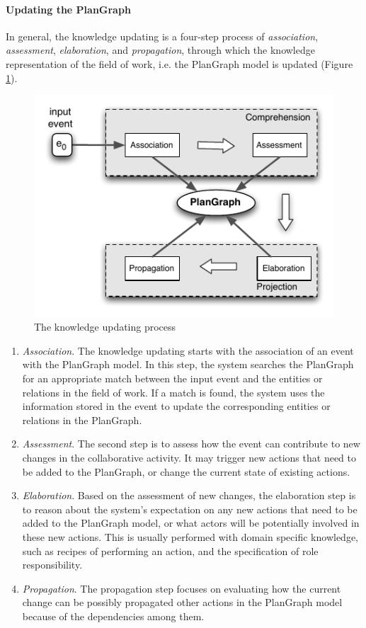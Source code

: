 \paragraph*{Updating the PlanGraph} %
\label{par:updating_the_plangraph}
In general, the knowledge updating is a four-step process of \emph{association}, \emph{assessment}, \emph{elaboration}, and \emph{propagation}, through which the knowledge representation of the field of work, i.e. the PlanGraph model is updated (Figure \ref{fig:updating_plangraph}).
\begin{figure}[htbp] %
	\centering
	\includegraphics{updating_plangraph.pdf} 
	\caption{The knowledge updating process}
	\label{fig:updating_plangraph}
\end{figure}

\begin{enumerate}
	\item \emph{Association}. The knowledge updating starts with the association of an event with the PlanGraph model. In this step, the system searches the PlanGraph for an appropriate match between the input event and the entities or relations in the field of work. If a match is found, the system uses the information stored in the event to update the corresponding entities or relations in the PlanGraph.
	\item \emph{Assessment}. The second step is to assess how the event can contribute to new changes in the collaborative activity. It may trigger new actions that need to be added to the PlanGraph, or change the current state of existing actions. 
	\item \emph{Elaboration}. Based on the assessment of new changes, the elaboration step is to reason about the system's expectation on any new actions that need to be added to the PlanGraph model, or what actors will be potentially involved in these new actions. This is usually performed with domain specific knowledge, such as recipes of performing an action, and the specification of role responsibility.
	\item \emph{Propagation}. The propagation step focuses on evaluating how the current change can be possibly propagated other actions in the PlanGraph model because of the dependencies among them. 
\end{enumerate}

